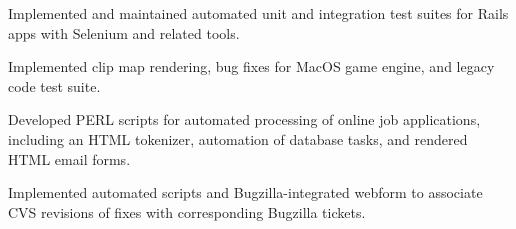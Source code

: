 \documentclass[]{jhearn-resume}
\begin{document}
\begin{minipage}[t]{0.67\textwidth}
Implemented and maintained automated unit and integration test suites for Rails apps with Selenium and related tools.
\sectionsep

Implemented clip map rendering, bug fixes for MacOS game engine, and legacy code test suite.
\sectionsep

Developed PERL scripts for automated processing of online job applications, including an HTML tokenizer, automation of database tasks, and rendered HTML email forms.
\sectionsep

Implemented automated scripts and Bugzilla-integrated webform to associate CVS revisions of fixes with corresponding Bugzilla tickets.
\sectionsep

\end{minipage}
\hfill
\end{document}
